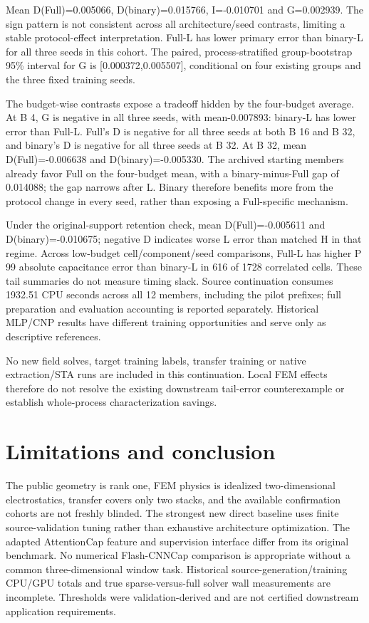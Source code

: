 \documentclass[10pt,twocolumn]{article}
\begin{document}
Mean D(Full)=0.005066, D(binary)=0.015766, I=-0.010701 and G=0.002939. The sign pattern is not consistent across all architecture/seed contrasts, limiting a stable protocol-effect interpretation. Full-L has lower primary error than binary-L for all three seeds in this cohort. The paired, process-stratified group-bootstrap 95\% interval for G is [0.000372,0.005507], conditional on four existing groups and the three fixed training seeds.

The budget-wise contrasts expose a tradeoff hidden by the four-budget average. At B 4, G is negative in all three seeds, with mean-0.007893: binary-L has lower error than Full-L. Full's D is negative for all three seeds at both B 16 and B 32, and binary's D is negative for all three seeds at B 32. At B 32, mean D(Full)=-0.006638 and D(binary)=-0.005330. The archived starting members already favor Full on the four-budget mean, with a binary-minus-Full gap of 0.014088; the gap narrows after L. Binary therefore benefits more from the protocol change in every seed, rather than exposing a Full-specific mechanism.

Under the original-support retention check, mean D(Full)=-0.005611 and D(binary)=-0.010675; negative D indicates worse L error than matched H in that regime. Across low-budget cell/component/seed comparisons, Full-L has higher P 99 absolute capacitance error than binary-L in 616 of 1728 correlated cells. These tail summaries do not measure timing slack. Source continuation consumes 1932.51 CPU seconds across all 12 members, including the pilot prefixes; full preparation and evaluation accounting is reported separately. Historical MLP/CNP results have different training opportunities and serve only as descriptive references.

No new field solves, target training labels, transfer training or native extraction/STA runs are included in this continuation. Local FEM effects therefore do not resolve the existing downstream tail-error counterexample or establish whole-process characterization savings.

\section*{Limitations and conclusion}

The public geometry is rank one, FEM physics is idealized two-dimensional electrostatics, transfer covers only two stacks, and the available confirmation cohorts are not freshly blinded. The strongest new direct baseline uses finite source-validation tuning rather than exhaustive architecture optimization. The adapted AttentionCap feature and supervision interface differ from its original benchmark. No numerical Flash-CNNCap comparison is appropriate without a common three-dimensional window task. Historical source-generation/training CPU/GPU totals and true sparse-versus-full solver wall measurements are incomplete. Thresholds were validation-derived and are not certified downstream application requirements.
\end{document}
